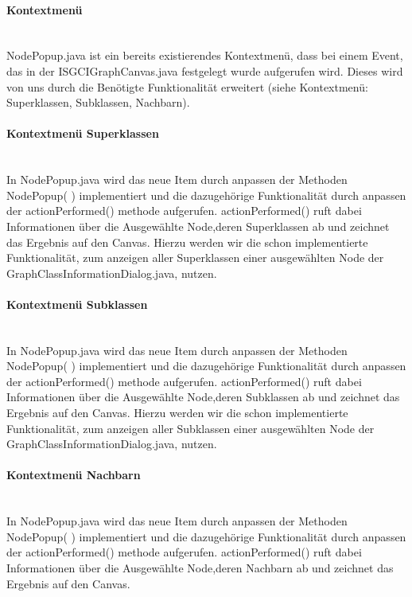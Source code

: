 \documentclass[10pt,a4paper]{article}
\begin{document}
\paragraph{Kontextmenü}\ \\ 

NodePopup.java ist ein bereits existierendes Kontextmenü, dass bei einem Event, das in der ISGCIGraphCanvas.java festgelegt wurde aufgerufen wird. Dieses wird von uns durch die Benötigte Funktionalität erweitert (siehe Kontextmenü: Superklassen, Subklassen, Nachbarn).

\paragraph{Kontextmenü Superklassen}\ \\ 

In NodePopup.java wird das neue Item durch anpassen der Methoden NodePopup( ) implementiert und die dazugehörige Funktionalität durch anpassen der actionPerformed() methode aufgerufen. actionPerformed() ruft dabei Informationen über die Ausgewählte Node,deren Superklassen ab und zeichnet das Ergebnis auf den Canvas. Hierzu werden wir die schon implementierte Funktionalität, zum anzeigen aller Superklassen einer ausgewählten Node der GraphClassInformationDialog.java, nutzen.

\paragraph{Kontextmenü Subklassen}\ \\ 

In NodePopup.java wird das neue Item durch anpassen der Methoden NodePopup( ) implementiert und die dazugehörige Funktionalität durch anpassen der actionPerformed() methode aufgerufen. actionPerformed() ruft dabei Informationen über die Ausgewählte Node,deren Subklassen ab und zeichnet das Ergebnis auf den Canvas. Hierzu werden wir die schon implementierte Funktionalität, zum anzeigen aller Subklassen einer ausgewählten Node der GraphClassInformationDialog.java, nutzen.

\paragraph{Kontextmenü Nachbarn}\ \\ 

In NodePopup.java wird das neue Item durch anpassen der Methoden NodePopup( ) implementiert und die dazugehörige Funktionalität durch anpassen der actionPerformed() methode aufgerufen. actionPerformed() ruft dabei Informationen über die Ausgewählte Node,deren Nachbarn ab und zeichnet das Ergebnis auf den Canvas. 
\end{document}

